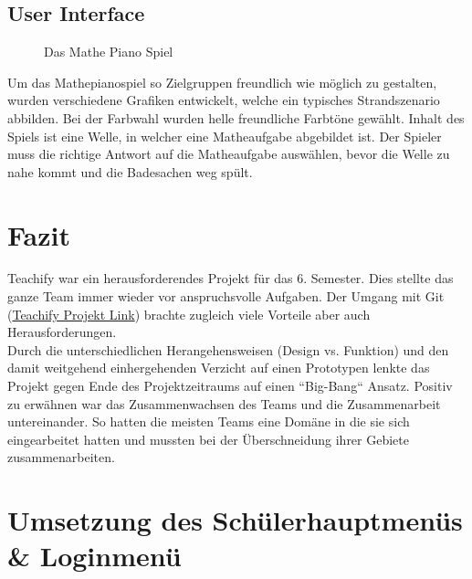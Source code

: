 \subsection{User Interface}
\begin{figure}[H]
	\centering
	\caption{Das Mathe Piano Spiel}
	\label{Das Mathe Piano Spiel}
\end{figure}
Um das Mathepianospiel so Zielgruppen freundlich wie möglich zu gestalten, wurden verschiedene Grafiken entwickelt, welche ein typisches Strandszenario abbilden. Bei der Farbwahl wurden helle freundliche Farbtöne gewählt. Inhalt des Spiels ist eine Welle, in welcher eine Matheaufgabe abgebildet ist. Der Spieler muss die richtige Antwort auf die Matheaufgabe auswählen, bevor die Welle zu nahe kommt und die Badesachen weg spült.



\section{Fazit}
Teachify war ein herausforderendes Projekt für das 6. Semester. Dies stellte das ganze Team immer wieder vor anspruchsvolle Aufgaben. Der Umgang mit Git (\href{https://github.com/cpfeiffer3008/Teachify}{Teachify Projekt Link}) brachte zugleich viele Vorteile aber auch Herausforderungen.\\
Durch die unterschiedlichen Herangehensweisen (Design vs. Funktion) und den damit weitgehend einhergehenden Verzicht auf einen Prototypen lenkte das Projekt gegen Ende des Projektzeitraums auf einen ``Big-Bang`` Ansatz.
Positiv zu erwähnen war das Zusammenwachsen des Teams und die Zusammenarbeit untereinander. So hatten die meisten Teams eine Domäne in die sie sich eingearbeitet hatten und mussten bei der Überschneidung ihrer Gebiete zusammenarbeiten.

\section{Umsetzung des Schülerhauptmenüs \& Loginmenü}